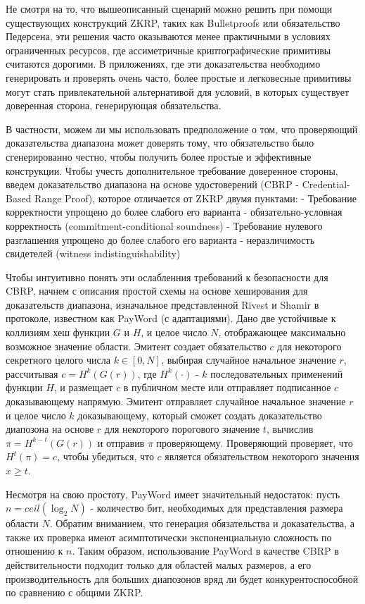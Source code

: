 \documentclass[a4paper]{report}
\begin{document}
	Не смотря на то, что вышеописанный сценарий можно решить при помощи существующих конструкций ZKRP, таких как Bulletproofs или обязательство Педерсена, эти решения часто оказываются менее практичными в условиях ограниченных ресурсов, где ассиметричные криптографические примитивы считаются дорогими.
	В приложениях, где эти доказательства необходимо генерировать и проверять очень часто, более простые и легковесные примитивы могут стать привлекательной альтернативой для условий, в которых существует доверенная сторона, генерирующая обязательства.

	В частности, можем ли мы использовать предположение о том, что проверяющий доказательства диапазона может доверять тому, что обязательство было сгенерированно честно, чтобы получить более простые и эффективные конструкции.
	Чтобы учесть дополнительное требование доверенное стороны, введем доказательство диапазона на основе удостоверений (CBRP - Credential-Based Range Proof), которое отличается от ZKRP двумя пунктами:
	- Требование корректности упрощено до более слабого его варианта - обязательно-условная корректность (commitment-conditional soundness)
	- Требование нулевого разглашения упрощено до более слабого его варианта - неразличимость свидетелей (witness indistinguishability)

	Чтобы интуитивно понять эти ослабленния требований к безопасности для CBRP, начнем с описания простой схемы на основе хеширования для доказательств диапазона, изначальное представленной Rivest и Shamir \cite{10.1007/3-540-62494-5_6} в протоколе, известном как PayWord (с адаптациями).
	Дано две устойчивые к коллизиям хеш функции $G$ и $H$, и целое число $N$, отображающее максимально возможное значение области.
	Эмитент создает обязательство $c$ для некоторого секретного целого числа $k \in [0, N]$, выбирая случайное начальное значение $r$, рассчитывая $c = H^k(G(r))$, где $H^k(\cdot)$ - $k$ последовательных применений функции $H$, и размещает $c$ в публичном месте или отправляет подписанное $c$ доказывающему напрямую.
	Эмитент отправляет случайное начальное значение $r$ и целое число $k$ доказывающему, который сможет создать доказательство диапозона на основе $r$ для некоторого порогового значение $t$, вычислив $\pi = H^{k - t}(G(r))$ и отправив $\pi$ проверяющему.
	Проверяющий проверяет, что $H^t(\pi) = c$, чтобы убедиться, что $c$ является обязательством некоторого значения $x \geq t$.

	Несмотря на свою простоту, PayWord имеет значительный недостаток: пусть $n = ceil(\log_2 N)$ - количество бит, необходимых для представления размера области $N$.
	Обратим вниманием, что генерация обязательства и доказательства, а также их проверка имеют асимптотически экспоненциальную сложность по отношению к $n$.
	Таким образом, использование PayWord в качестве CBRP в действительности подходит только для областей малых размеров, а его производительность для больших диапозонов вряд ли будет конкурентоспособной по сравнению с общими ZKRP.
\end{document}
